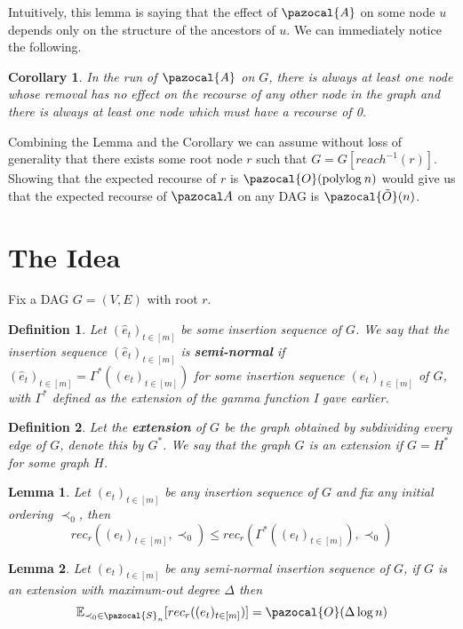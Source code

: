 \documentclass{article}
\newtheorem{lemma}{Lemma}
\newtheorem{corollary}{Corollary}
\newtheorem{definition}{Definition}
\begin{document}
Intuitively, this lemma is saying that the effect of $\pazocal{A}$ on some node $u$ depends only on the structure of the ancestors of $u$. We can immediately notice the following.

\begin{corollary}
In the run of $\pazocal{A}$ on $G$, there is always at least one node whose removal has no effect on the recourse of any other node in the graph and there is always at least one node which must have a recourse of 0.
\end{corollary}

Combining the Lemma and the Corollary we can assume without loss of generality that there exists some root node $r$ such that $G = G[reach^{-1}(r)]$. Showing that the expected recourse of $r$ is $\pazocal{O}(\textrm{polylog} \: n)$ would give us that the expected recourse of $\pazocal A$ on any DAG is $\pazocal{\tilde O}(n)$. 

\section{The Idea}

Fix a DAG $G=(V,E)$ with root $r$.

\begin{definition}
Let $(\hat e_t)_{t \in [m]}$ be some insertion sequence of $G$. We say that the insertion sequence $(\hat e_t)_{t \in [m]}$ is \textbf{semi-normal} if $(\hat e_t)_{t \in [m]} = \Gamma^*((e_t)_{t \in [m]})$ for some insertion sequence $(e_t)_{t \in [m]}$ of $G$, with $\Gamma^*$ defined as the extension of the gamma function I gave earlier.
\end{definition}

\begin{definition}
Let the \textbf{extension} of $G$ be the graph obtained by subdividing every edge of $G$, denote this by $G^*$. We say that the graph $G$ is an extension if $G = H^*$ for some graph $H$.
\end{definition}

\begin{lemma}
Let $(e_t)_{t \in [m]}$ be any insertion sequence of $G$ and fix any initial ordering $\prec_0$, then 
\[ rec_r((e_t)_{t \in [m]}, \prec_0) \leq rec_r(\Gamma^*((e_t)_{t \in [m]}), \prec_0) \]
\end{lemma}

\begin{lemma}
Let $(e_t)_{t \in [m]}$ be any semi-normal insertion sequence of $G$, if $G$ is an extension with maximum-out degree $\Delta$ then
\[ \mathbb{E}_{\prec_0 \in \pazocal{S}_n}[ rec_r((e_t)_{t \in [m]})] = \pazocal{O}(\Delta \log n) \]
\end{lemma}
\end{document}
